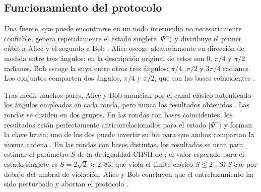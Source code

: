\subsection{Funcionamiento del protocolo}

Una fuente, que puede encontrarse en un nodo intermedio no necesariamente confiable, genera repetidamente el estado singlete $|\Psi^-\rangle$ y distribuye el primer cúbit a Alice y el segundo a Bob \citep{ekert1991}. Alice escoge aleatoriamente su dirección de medida entre tres ángulos; en la descripción original de \cite{ekert1991} estos son $0$, $\pi/4$ y $\pi/2$ radianes. Bob escoge la suya entre otros tres ángulos: $\pi/4$, $\pi/2$ y $3\pi/4$ radianes. Los conjuntos comparten dos ángulos, $\pi/4$ y $\pi/2$, que son las bases coincidentes \citep{ekert1991,gisin2002}.

Tras medir muchos pares, Alice y Bob anuncian por el canal clásico autenticado los ángulos empleados en cada ronda, pero nunca los resultados obtenidos \citep{bennett1984,ekert1991}. Las rondas se dividen en dos grupos. En las rondas con bases coincidentes, los resultados están perfectamente anticorrelacionados para el estado $|\Psi^-\rangle$ y forman la clave bruta; uno de los dos puede invertir su bit para que ambos compartan la misma cadena \citep{ekert1991}. En las rondas con bases distintas, los resultados se usan para estimar el parámetro $S$ de la desigualdad CHSH de \cite{clauser1969}; el valor esperado para el estado singlete es $S = 2\sqrt{2} \approx 2{,}83$, que viola el límite clásico $S \leq 2$ \citep{clauser1969,ekert1991}. Si $S$ cae por debajo del umbral de violación, Alice y Bob concluyen que el entrelazamiento ha sido perturbado y abortan el protocolo \citep{ekert1991,scarani2009}.

